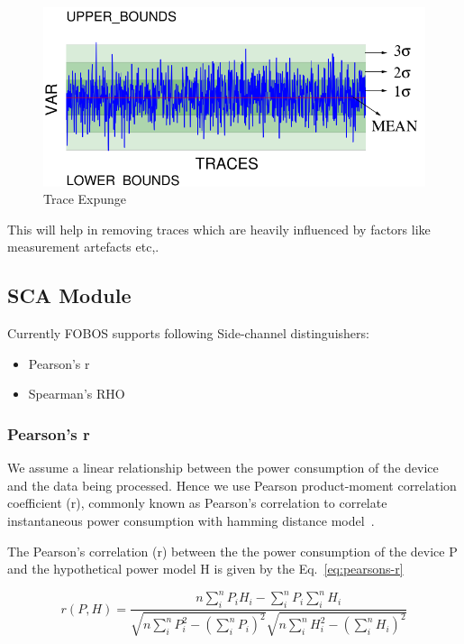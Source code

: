 \documentclass{llncs}
\numberwithin{algorithm}{chapter}
\begin{document}
\begin{figure}[ht]
\begin{center}
\includegraphics[scale=0.6]{figures/traceExpungMod}
\caption{\label{fig:tex}Trace Expunge}
\end{center} 
\vspace{-3ex}
\end{figure}

This will help in removing traces which are heavily influenced by factors like measurement artefacts etc,.

\subsection{SCA Module}
Currently FOBOS supports following Side-channel distinguishers:
\begin{itemize}
\item Pearson's r
\item Spearman's RHO
\end{itemize}
\subsubsection{Pearson's r}
We assume a linear relationship between the power consumption of the device
and the data being processed. Hence we use Pearson product-moment correlation
coefficient (r), commonly known as Pearson's correlation to correlate instantaneous power
consumption with hamming distance model~\cite{1203}.

The Pearson's correlation (r) between the the power consumption of the device P and the
hypothetical power model H is given by the Eq.~\ref{eq:pearsons-r}

\begin{equation}\label{eq:pearsons-r}
r(P,H) =\frac{n \sum_{i}^{n}{P_iH_i}-\sum_{i}^{n} P_i\sum_{i}^{n}H_i}{\sqrt{n\sum_{i}^{n} 
	      P_i^2-(\sum_{i}^{n} P_i)^2}\sqrt {n\sum_{i}^{n} H_i^2-(\sum_{i}^{n} H_i)^2}}
\end{equation}   
\end{document}

